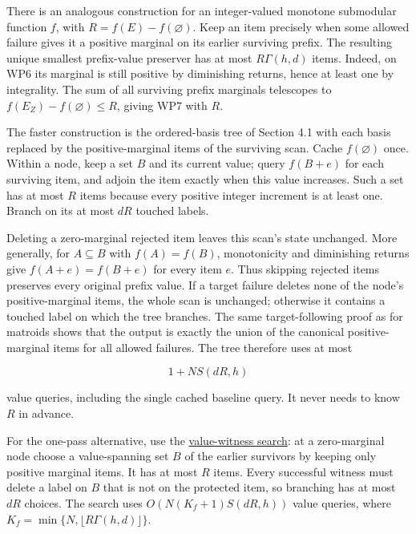 There is an analogous construction for an integer-valued monotone submodular function \(f\), with \(R=f(E)-f(\varnothing)\). Keep an item precisely when some allowed failure gives it a positive marginal on its earlier surviving prefix. The resulting unique smallest prefix-value preserver has at most \(R\Gamma(h,d)\) items. Indeed, on WP6 its marginal is still positive by diminishing returns, hence at least one by integrality. The sum of all surviving prefix marginals telescopes to \(f(E_Z)-f(\varnothing)\le R\), giving WP7 with \(R\).

The faster construction is the ordered-basis tree of Section 4.1 with each basis replaced by the positive-marginal items of the surviving scan. Cache \(f(\varnothing)\) once. Within a node, keep a set \(B\) and its current value; query \(f(B+e)\) for each surviving item, and adjoin the item exactly when this value increases. Such a set has at most \(R\) items because every positive integer increment is at least one. Branch on its at most \(dR\) touched labels.

Deleting a zero-marginal rejected item leaves this scan's state unchanged. More generally, for \(A\subseteq B\) with \(f(A)=f(B)\), monotonicity and diminishing returns give \(f(A+e)=f(B+e)\) for every item \(e\). Thus skipping rejected items preserves every original prefix value. If a target failure deletes none of the node's positive-marginal items, the whole scan is unchanged; otherwise it contains a touched label on which the tree branches. The same target-following proof as for matroids shows that the output is exactly the union of the canonical positive-marginal items for all allowed failures. The tree therefore uses at most

\[
1+NS(dR,h)
\tag{WP9a}
\]

value queries, including the single cached baseline query. It never needs to know \(R\) in advance.

For the one-pass alternative, use the \href{https://github.com/icekylinx/algorithm-frontier/blob/main/problems/matroid-failure-summaries/manuscripts/arbitrary-matroid-and-submodular-failure-summaries.md\#9-monotone-submodular-functions}{value-witness search}: at a zero-marginal node choose a value-spanning set \(B\) of the earlier survivors by keeping only positive marginal items. It has at most \(R\) items. Every successful witness must delete a label on \(B\) that is not on the protected item, so branching has at most \(dR\) choices. The search uses \(O(N(K_f+1)S(dR,h))\) value queries, where \(K_f=\min\{N,\lfloor R\Gamma(h,d)\rfloor\}\).

